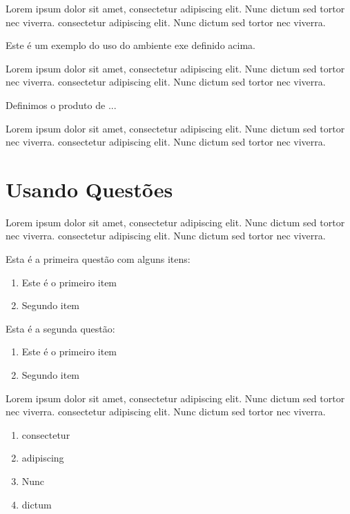 Lorem ipsum dolor sit amet, consectetur adipiscing elit. Nunc dictum sed tortor nec viverra. consectetur adipiscing elit. Nunc dictum sed tortor nec viverra.

\begin{exem}
	Este é um exemplo do uso do ambiente exe definido acima.
\end{exem}

Lorem ipsum dolor sit amet, consectetur adipiscing elit. Nunc dictum sed tortor nec viverra. consectetur adipiscing elit. Nunc dictum sed tortor nec viverra.

\begin{xdefinicao}
	Definimos o produto de ...
\end{xdefinicao}

Lorem ipsum dolor sit amet, consectetur adipiscing elit. Nunc dictum sed tortor nec viverra. consectetur adipiscing elit. Nunc dictum sed tortor nec viverra.

\section{Usando Questões}

Lorem ipsum dolor sit amet, consectetur adipiscing elit. Nunc dictum sed tortor nec viverra. consectetur adipiscing elit. Nunc dictum sed tortor nec viverra.

\begin{questao}
	\item Esta é a primeira questão com alguns itens:
		\begin{enumerate}
			\item Este é o primeiro item
			\item Segundo item
		\end{enumerate}
	\item Esta é a segunda questão:
		\begin{enumerate}
			\item Este é o primeiro item
			\item Segundo item
		\end{enumerate}
	\item Lorem ipsum dolor sit amet, consectetur adipiscing elit. Nunc dictum sed tortor nec viverra. consectetur adipiscing elit. Nunc dictum sed tortor nec viverra.
		\begin{enumerate}
			\item consectetur
			\item adipiscing
			\item Nunc
			\item dictum
		\end{enumerate}
\end{questao}

